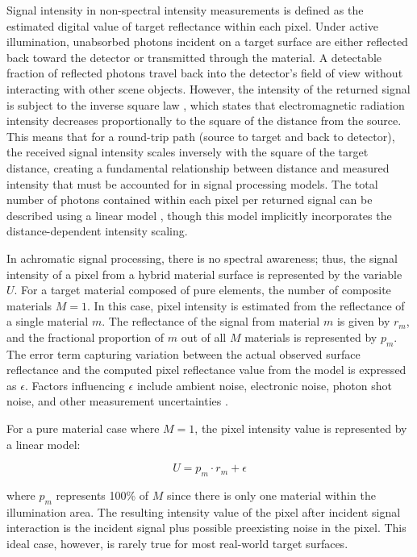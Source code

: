 \documentclass[12pt,a4paper,oneside]{report}
\begin{document}
Signal intensity in non-spectral intensity measurements is defined as the estimated digital value of target reflectance within each pixel. Under active illumination, unabsorbed photons incident on a target surface are either reflected back toward the detector or transmitted through the material. A detectable fraction of reflected photons travel back into the detector's field of view without interacting with other scene objects. However, the intensity of the returned signal is subject to the inverse square law \cite{griffiths2017}, which states that electromagnetic radiation intensity decreases proportionally to the square of the distance from the source. This means that for a round-trip path (source to target and back to detector), the received signal intensity scales inversely with the square of the target distance, creating a fundamental relationship between distance and measured intensity that must be accounted for in signal processing models. The total number of photons contained within each pixel per returned signal can be described using a linear model \cite{heinz2001,schott2007}, though this model implicitly incorporates the distance-dependent intensity scaling.

In achromatic signal processing, there is no spectral awareness; thus, the signal intensity of a pixel from a hybrid material surface is represented by the variable $U$. For a target material composed of pure elements, the number of composite materials $M = 1$. In this case, pixel intensity is estimated from the reflectance of a single material $m$. The reflectance of the signal from material $m$ is given by $r_m$, and the fractional proportion of $m$ out of all $M$ materials is represented by $p_m$. The error term capturing variation between the actual observed surface reflectance and the computed pixel reflectance value from the model is expressed as $\epsilon$. Factors influencing $\epsilon$ include ambient noise, electronic noise, photon shot noise, and other measurement uncertainties \cite{schott2007}.

For a pure material case where $M = 1$, the pixel intensity value is represented by a linear model:

\begin{equation}
U = p_m \cdot r_m + \epsilon
\label{eq:3_1}
\end{equation}

where $p_m$ represents 100\% of $M$ since there is only one material within the illumination area. The resulting intensity value of the pixel after incident signal interaction is the incident signal plus possible preexisting noise in the pixel. This ideal case, however, is rarely true for most real-world target surfaces.
\end{document}
